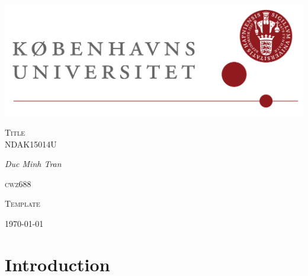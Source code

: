 
\author{Minh}

	\begin{titlepage}
		\centering
		\includegraphics[width=1.1\textwidth]{KuLogo.png}\par\vspace{1cm}
		\vspace{1cm}
		{\scshape\Large Title \\
			NDAK15014U\par}
		\vspace{1.5cm}
		{\Large\itshape Duc Minh Tran }\\
		\vspace{0.5cm}
		{\scshape\large cwz688 \\ \par}
		\vfill
		{\Large\scshape Template \par}
		\vfill
		\par
		\vfill
		{\large \today\par}
	\end{titlepage}
	\newpage
	\section{Introduction}


